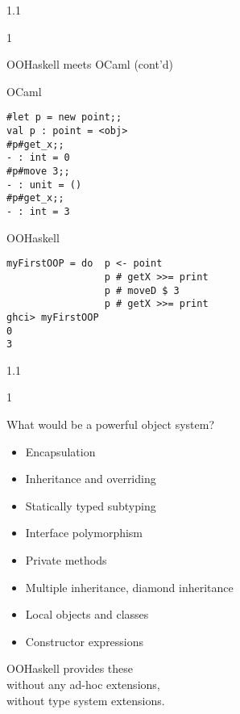 \documentclass{slides}
\newenvironment{myslide}{\begin{slide}\color{Blue}\begin{boxedminipage}{1.1\hsize}\begin{boxedminipage}{1\hsize}\color{Black}
\vspace{-170\in}
}{%
\smallskip
\end{boxedminipage}
\end{boxedminipage}
\end{slide}}
\newenvironment{myslide}{\begin{slide}
}{%
\end{slide}}
\newenvironment{myslide}{\begin{slide}\color{White}\begin{boxedminipage}{1.1\hsize}\color{Black}
\vspace{-170\in}
}{%
\smallskip
\end{boxedminipage}
\end{slide}}
\newcommand{\noskip}{\topsep1pt \parskip1pt \partopsep1pt}
\newcommand{\header}[1]{{\large \color{Red} #1}}
\begin{document}
\begin{myslide}

\header{OOHaskell meets OCaml (cont'd)}

{\tiny

OCaml

\begin{verbatim}
#let p = new point;;
val p : point = <obj>
#p#get_x;;
- : int = 0
#p#move 3;;
- : unit = ()
#p#get_x;;
- : int = 3
\end{verbatim}

OOHaskell

\begin{verbatim}
myFirstOOP = do  p <- point
                 p # getX >>= print
                 p # moveD $ 3
                 p # getX >>= print
ghci> myFirstOOP
0
3
\end{verbatim}

}


\end{myslide}






\begin{myslide}

\header{What would be a powerful object system?}

\medskip

{\small

\noskip\begin{itemize}
\item Encapsulation
\item Inheritance and overriding
\item Statically typed subtyping
\item Interface polymorphism
\item Private methods
\item Multiple inheritance, diamond inheritance
\item Local objects and classes
\item Constructor expressions
\end{itemize}
}

\medskip

OOHaskell provides these\\
without any ad-hoc extensions,\\
without type system extensions.

\end{myslide}
\end{document}
